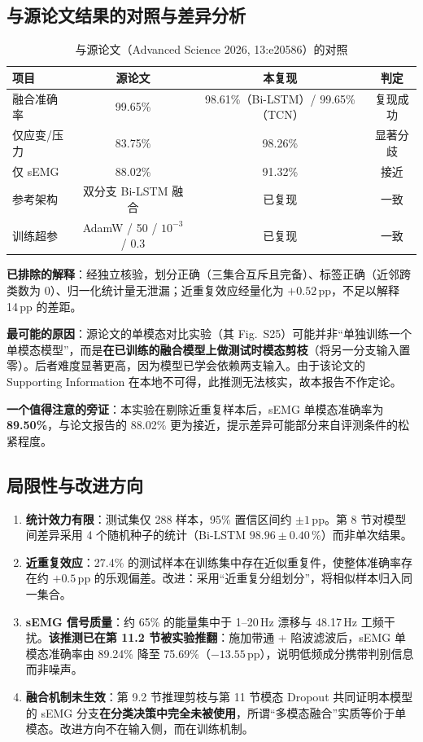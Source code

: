 \documentclass[11pt,a4paper]{ctexart}
\begin{document}
\subsection{与源论文结果的对照与差异分析}
\label{sec:gap}

\begin{table}[htbp]\centering
\caption{与源论文（Advanced Science 2026, 13:e20586）的对照}
\label{tab:gap}
\small
\begin{tabular}{lccc}
\toprule
项目 & 源论文 & 本复现 & 判定 \\
\midrule
融合准确率 & 99.65\% & 98.61\%（Bi-LSTM）/ 99.65\%（TCN） & 复现成功 \\
仅应变/压力 & 83.75\% & 98.26\% & 显著分歧 \\
仅 sEMG & 88.02\% & 91.32\% & 接近 \\
参考架构 & 双分支 Bi-LSTM 融合 & 已复现 & 一致 \\
训练超参 & AdamW / 50 / $10^{-3}$ / 0.3 & 已复现 & 一致 \\
\bottomrule
\end{tabular}
\end{table}

\textbf{已排除的解释}：经独立核验，划分正确（三集合互斥且完备）、标签正确（近邻跨类数为 0）、归一化统计量无泄漏；近重复效应经量化为 $+0.52$\,pp，不足以解释 14\,pp 的差距。

\textbf{最可能的原因}：源论文的单模态对比实验（其 Fig.~S25）可能并非“单独训练一个单模态模型”，而是\textbf{在已训练的融合模型上做测试时模态剪枝}（将另一分支输入置零）。后者难度显著更高，因为模型已学会依赖两支输入。由于该论文的 Supporting Information 在本地不可得，此推测无法核实，故本报告不作定论。

\textbf{一个值得注意的旁证}：本实验在剔除近重复样本后，sEMG 单模态准确率为 \textbf{89.50\%}，与论文报告的 88.02\% 更为接近，提示差异可能部分来自评测条件的松紧程度。

\subsection{局限性与改进方向}

\begin{enumerate}[leftmargin=2em]
\item \textbf{统计效力有限}：测试集仅 288 样本，95\% 置信区间约 $\pm1$\,pp。第 8 节对模型间差异采用 4 个随机种子的统计（Bi-LSTM $98.96\pm0.40$\,\%）而非单次结果。
\item \textbf{近重复效应}：27.4\% 的测试样本在训练集中存在近似重复件，使整体准确率存在约 $+0.5$\,pp 的乐观偏差。改进：采用“近重复分组划分”，将相似样本归入同一集合。
\item \textbf{sEMG 信号质量}：约 65\% 的能量集中于 1--20\,Hz 漂移与 48.17\,Hz 工频干扰。\textbf{该推测已在第 11.2 节被实验推翻}：施加带通 + 陷波滤波后，sEMG 单模态准确率由 89.24\% 降至 75.69\%（$-13.55$\,pp），说明低频成分携带判别信息而非噪声。
\item \textbf{融合机制未生效}：第 9.2 节推理剪枝与第 11 节模态 Dropout 共同证明本模型的 sEMG 分支\textbf{在分类决策中完全未被使用}，所谓“多模态融合”实质等价于单模态。改进方向不在输入侧，而在训练机制。
\end{enumerate}
\end{document}
